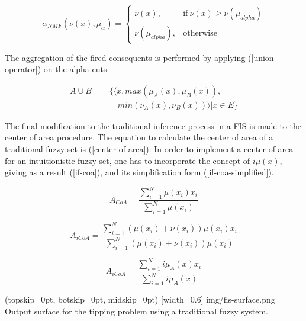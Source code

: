 \documentclass{ieeeaccess}
\begin{document}
\begin{equation}
  \label{nmf-alpha-cut}
  \alpha_{NMF}(\nu (x),\mu_{\alpha}) =
  \begin{cases}
    \nu (x), & \text{if}\ \nu (x) \geq \nu (\mu_{alpha})  \\
    \nu (\mu_{alpha}), & \text{otherwise}
  \end{cases}
\end{equation}

The aggregation of the fired consequents is performed by applying
(\ref{union-operator}) on the alpha-cuts.

\begin{equation}
  \label{union-operator}
  \begin{aligned}
    A \cup B  = &\{ \langle x, max(\mu_{A} (x), \mu_{B} (x)),\\
    &\quad min(\nu_{A} (x), \nu_{B} (x)) \rangle | x \in E \}
\end{aligned}
\end{equation}

The final modification to the traditional inference process in a FIS is made to
the center of area procedure. The equation to calculate the center of area of a traditional fuzzy set is 
(\ref{center-of-area}). In order to implement a center of area for an intuitionistic fuzzy set, 
one has to incorporate the concept of $i\mu(x)$, giving as a result (\ref{if-coa}), 
and its simplification form (\ref{if-coa-simplified}).

\begin{equation}
  \label{center-of-area}
  A_{CoA} = \dfrac{\sum_{i=1}^{N} \mu(x_{i})
    x_{i}}{\sum_{i=1}^{N} \mu(x_{i})}
\end{equation}

\begin{equation}
  \label{if-coa}
  A_{iCoA} = \dfrac{\sum_{i=1}^{N} (\mu(x_{i}) + \nu(x_{i})) \mu(x_{i})
    x_{i}}{\sum_{i=1}^{N} (\mu(x_{i}) + \nu(x_{i})) \mu(x_{i})}
\end{equation}

\begin{equation}
  \label{if-coa-simplified}
  A_{iCoA} = \dfrac{\sum_{i=1}^{N} i\mu_{A}(x) x_{i}}{\sum_{i=1}^{N}
    i\mu_{A}(x)}
\end{equation}

\Figure[](topskip=0pt, botskip=0pt, midskip=0pt)
[width=0.6\linewidth]
{img/fis-surface.png}
{Output surface for the tipping problem using a traditional fuzzy system.
  \label{figure:tipping-output-surface}}
\end{document}

